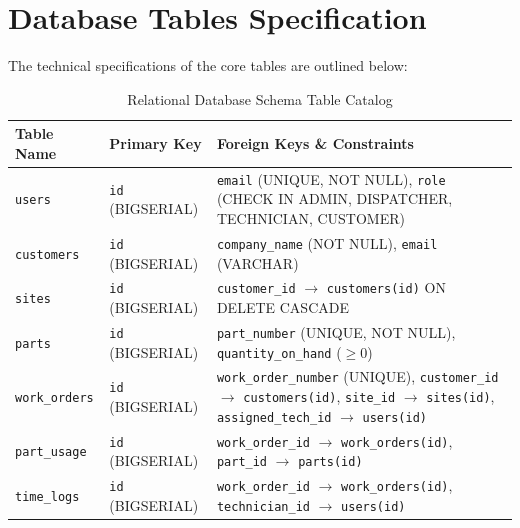 \documentclass[12pt,a4paper,oneside]{report}
\begin{document}
\section{Database Tables Specification}
The technical specifications of the core tables are outlined below:

\begin{table}[htbp]
    \centering
    \small
    \caption{Relational Database Schema Table Catalog}
    \label{tab:db_tables}
    \begin{tabularx}{\textwidth}{lp{4cm}X}
        \toprule
        \textbf{Table Name} & \textbf{Primary Key} & \textbf{Foreign Keys \& Constraints} \\
        \midrule
        \texttt{users} & \texttt{id} (BIGSERIAL) & \texttt{email} (UNIQUE, NOT NULL), \texttt{role} (CHECK IN ADMIN, DISPATCHER, TECHNICIAN, CUSTOMER) \\
        \texttt{customers} & \texttt{id} (BIGSERIAL) & \texttt{company\_name} (NOT NULL), \texttt{email} (VARCHAR) \\
        \texttt{sites} & \texttt{id} (BIGSERIAL) & \texttt{customer\_id} $\rightarrow$ \texttt{customers(id)} ON DELETE CASCADE \\
        \texttt{parts} & \texttt{id} (BIGSERIAL) & \texttt{part\_number} (UNIQUE, NOT NULL), \texttt{quantity\_on\_hand} ($\ge 0$) \\
        \texttt{work\_orders} & \texttt{id} (BIGSERIAL) & \texttt{work\_order\_number} (UNIQUE), \texttt{customer\_id} $\rightarrow$ \texttt{customers(id)}, \texttt{site\_id} $\rightarrow$ \texttt{sites(id)}, \texttt{assigned\_tech\_id} $\rightarrow$ \texttt{users(id)} \\
        \texttt{part\_usage} & \texttt{id} (BIGSERIAL) & \texttt{work\_order\_id} $\rightarrow$ \texttt{work\_orders(id)}, \texttt{part\_id} $\rightarrow$ \texttt{parts(id)} \\
        \texttt{time\_logs} & \texttt{id} (BIGSERIAL) & \texttt{work\_order\_id} $\rightarrow$ \texttt{work\_orders(id)}, \texttt{technician\_id} $\rightarrow$ \texttt{users(id)} \\
        \bottomrule
    \end{tabularx}
\end{table}
\end{document}
